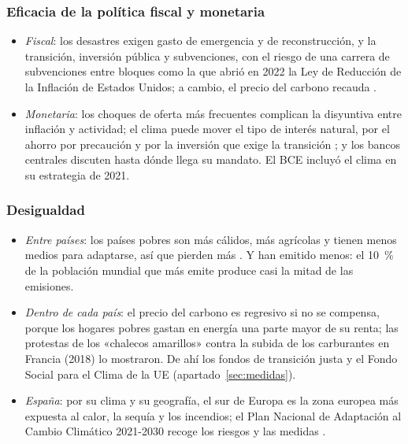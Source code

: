 \documentclass[11pt]{article}
\begin{document}
\subsubsection{Eficacia de la política fiscal y monetaria}\label{sec:canal-politicas}

\begin{itemize}
\item \emph{Fiscal}: los desastres exigen gasto de emergencia y de reconstrucción, y la transición, inversión pública y subvenciones, con el riesgo de una carrera de subvenciones entre bloques como la que abrió en 2022 la Ley de Reducción de la Inflación de Estados Unidos\nocite{EEUU2022IRA}; a cambio, el precio del carbono recauda .
\item \emph{Monetaria}: los choques de oferta más frecuentes complican la disyuntiva entre inflación y actividad; el clima puede mover el tipo de interés natural, por el ahorro por precaución y por la inversión que exige la transición ; y los bancos centrales discuten hasta dónde llega su mandato. El BCE incluyó el clima en su estrategia de 2021\nocite{BCE2021Clima}.
\end{itemize}

\subsubsection{Desigualdad}\label{sec:canal-desigualdad}

\begin{itemize}
\item \emph{Entre países}: los países pobres son más cálidos, más agrícolas y tienen menos medios para adaptarse, así que pierden más\nocite{BurkeHsiangMiguel2015Global} . Y han emitido menos: el 10~\% de la población mundial que más emite produce casi la mitad de las emisiones\nocite{Chancel2022Global}.
\item \emph{Dentro de cada país}: el precio del carbono es regresivo si no se compensa, porque los hogares pobres gastan en energía una parte mayor de su renta; las protestas de los «chalecos amarillos» contra la subida de los carburantes en Francia (2018) lo mostraron\nocite{DouenneFabre2022Yellow}. De ahí los fondos de transición justa y el Fondo Social para el Clima de la UE (apartado~\ref{sec:medidas}).
\item \emph{España}: por su clima y su geografía, el sur de Europa es la zona europea más expuesta al calor, la sequía y los incendios\nocite{EEA2024European}; el Plan Nacional de Adaptación al Cambio Climático 2021-2030 recoge los riesgos y las medidas\nocite{MITECO2020PNACC} .
\end{itemize}
\end{document}
